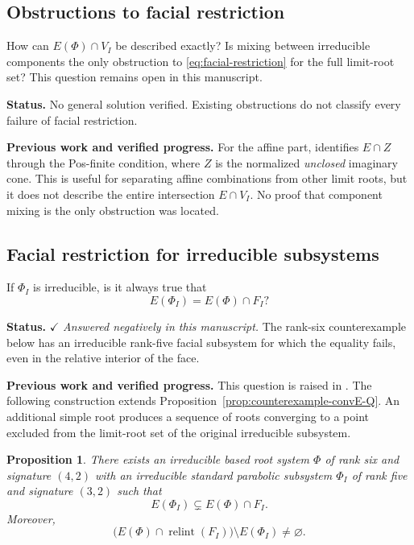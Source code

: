 \documentclass[11pt,reqno]{amsart}
\theoremstyle{plain}
\newtheorem{proposition}[theorem]{Proposition}
\theoremstyle{definition}
\theoremstyle{remark}
\numberwithin{equation}{section}
\begin{document}
\subsection{Obstructions to facial restriction}
How can $E(\Phi)\cap V_I$ be described exactly? Is mixing between
irreducible components the only obstruction to
\eqref{eq:facial-restriction} for the full limit-root set?
This question remains open in this manuscript.


\par\medskip
\noindent\textbf{Status.} No general solution verified. Existing obstructions do not classify every failure of facial restriction.

\par\medskip
\noindent\textbf{Previous work and verified progress.}
For the affine part, \cite[Corollary~5.33]{FRX2026} identifies
$E\cap Z$ through the Pos-finite condition, where $Z$ is the normalized
\emph{unclosed} imaginary cone. This is useful for separating affine
combinations from other limit roots, but it does not describe the entire
intersection $E\cap V_I$. No proof that component mixing is the only
obstruction was located.

\subsection{Facial restriction for irreducible subsystems}

If $\Phi_I$ is irreducible, is it always true that
\[
E(\Phi_I)=E(\Phi)\cap F_I?
\]

\par\medskip
\noindent\textbf{Status.}
\(\checkmark\) \textit{Answered negatively in this manuscript.}
The rank-six counterexample below has an irreducible rank-five
facial subsystem for which the equality fails, even in the
relative interior of the face.

\par\medskip
\noindent\textbf{Previous work and verified progress.}
This question is raised in \cite[Section~7.3]{DHR}.
The following construction extends
Proposition~\ref{prop:counterexample-convE-Q}.
An additional simple root produces a sequence of roots converging
to a point excluded from the limit-root set of the original
irreducible subsystem.

\begin{proposition}\label{prop:irreducible-facial-counterexample}
There exists an irreducible based root system $\Phi$ of rank six
and signature $(4,2)$ with an irreducible standard parabolic
subsystem $\Phi_I$ of rank five and signature $(3,2)$ such that
\[
E(\Phi_I)\subsetneq E(\Phi)\cap F_I.
\]
Moreover,
\[
\bigl(E(\Phi)\cap\operatorname{relint}(F_I)\bigr)
\setminus E(\Phi_I)\ne\varnothing.
\]
\end{proposition}
\end{document}
